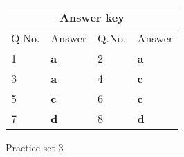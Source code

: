 \setlength\arrayrulewidth{1pt}
\begin{table}[H]
	\centering
	
	\begin{tabular}{|p{1.5cm}|p{1.5cm}||p{1.5cm}|p{1.5cm}|}
		\hline
		\multicolumn{4}{|c|}{\textbf{Answer key}}\\\hline\hline
		\rowcolor{ocrel}Q.No.&Answer&Q.No.&Answer\\\hline
		1&\textbf{a}&2&\textbf{a}\\\hline
		3&\textbf{a}&4&\textbf{c}\\\hline
		5&\textbf{c}&6&\textbf{c}\\\hline
		7&\textbf{d}&8&\textbf{d}\\\hline
	\end{tabular}
\end{table}
\newpage
\begin{abox}
	Practice set 3
	\end{abox}
